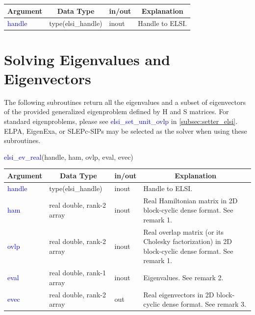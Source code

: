 \documentclass{report}
\begin{document}
\begin{tabular}[]{|p{30mm}|p{30mm}|p{15mm}|p{90mm}|}
\hline
\multicolumn{1}{|c|}{\textbf{Argument}} & \multicolumn{1}{c|}{\textbf{Data Type}} & \multicolumn{1}{c|}{\textbf{in/out}} & \multicolumn{1}{c|}{\textbf{Explanation}}\\
\hline
\textcolor{blue}{handle} & type(elsi\_handle) & inout & Handle to ELSI.\\
\hline
\end{tabular}

\section{Solving Eigenvalues and Eigenvectors}
\label{sec:ev}
The following subroutines return all the eigenvalues and a subset of eigenvectors of the provided generalized eigenproblem defined by H and S matrices. For standard eigenproblems, please see \textcolor{blue}{elsi\_set\_unit\_ovlp} in \ref{subsec:setter_elsi}. ELPA, EigenExa, or SLEPc-SIPs may be selected as the solver when using these subroutines.
\begin{labeling}{\hspace{6cm}}
\item [\hspace{0.3cm} \textcolor{blue}{elsi\_ev\_real}(handle, ham, ovlp, eval, evec)]
\end{labeling}

\begin{tabular}[]{|p{20mm}|p{45mm}|p{15mm}|p{85mm}|}
\hline
\multicolumn{1}{|c|}{\textbf{Argument}} & \multicolumn{1}{c|}{\textbf{Data Type}} & \multicolumn{1}{c|}{\textbf{in/out}} & \multicolumn{1}{c|}{\textbf{Explanation}}\\
\hline
\textcolor{blue}{handle} & type(elsi\_handle)        & inout & Handle to ELSI.\\
\hline
\textcolor{blue}{ham}    & real double, rank-2 array & inout & Real Hamiltonian matrix in 2D block-cyclic dense format. See remark 1.\\
\hline
\textcolor{blue}{ovlp}   & real double, rank-2 array & inout & Real overlap matrix (or its Cholesky factorization) in 2D block-cyclic dense format. See remark 1.\\
\hline
\textcolor{blue}{eval}   & real double, rank-1 array & inout & Eigenvalues. See remark 2.\\
\hline
\textcolor{blue}{evec}   & real double, rank-2 array & out   & Real eigenvectors in 2D block-cyclic dense format. See remark 3.\\
\hline
\end{tabular}
\end{document}
